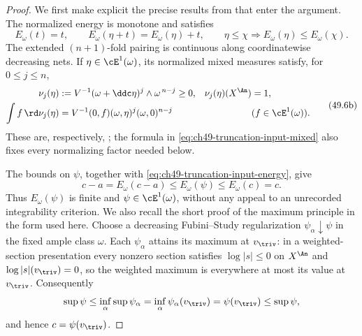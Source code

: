 \begin{proof}
We first make explicit the precise results from
 that enter the argument.  The
normalized energy is monotone and satisfies
\[
 E_\omega(t)=t,
 \qquad
 E_\omega(\eta+t)=E_\omega(\eta)+t,
 \qquad
 \eta\le\chi\Longrightarrow E_\omega(\eta)\le E_\omega(\chi).
\tag{49.6a}\label{eq:ch49-truncation-input-energy}
\]
The extended \((n+1)\)-fold pairing is continuous along coordinatewise
decreasing nets.  If \(\eta\in\cE^1(\omega)\), its normalized mixed
measures satisfy, for \(0\le j\le n\),
\[
 \begin{aligned}
 \nu_j(\eta)&:=V^{-1}(\omega+\ddc\eta)^j\wedge\omega^{\,n-j}\ge0,
 &\nu_j(\eta)(X^{\An})&=1,\\
 \int f\,\rd\nu_j(\eta)
 &=V^{-1}(0,f)(\omega,\eta)^j(\omega,0)^{n-j}
 &&(f\in\cE^1(\omega)).
 \end{aligned}
\tag{49.6b}\label{eq:ch49-truncation-input-mixed}
\]
These are, respectively,
;
the formula in \eqref{eq:ch49-truncation-input-mixed} also fixes every
normalizing factor needed below.

The bounds on \(\psi\), together with
\eqref{eq:ch49-truncation-input-energy}, give
\[
 c-a=E_\omega(c-a)\le E_\omega(\psi)\le E_\omega(c)=c.
\]
Thus \(E_\omega(\psi)\) is finite and
\(\psi\in\cE^1(\omega)\), without any appeal to an unrecorded
integrability criterion.  We also recall the short proof of the maximum
principle in the form used here.  Choose a decreasing Fubini--Study
regularization \(\psi_\alpha\downarrow\psi\) in the fixed ample class
\(\omega\).  Each \(\psi_\alpha\) attains its maximum at
\(v_{\triv}\): in a weighted-section presentation every nonzero section
satisfies \(\log|s|\le0\) on \(X^{\An}\) and
\(\log|s|(v_{\triv})=0\), so the weighted maximum is everywhere at most
its value at \(v_{\triv}\).  Consequently
\[
 \sup\psi\le\inf_\alpha\sup\psi_\alpha
 =\inf_\alpha\psi_\alpha(v_{\triv})
 =\psi(v_{\triv})\le\sup\psi,
\]
and hence \(c=\psi(v_{\triv})\).


\end{proof}
